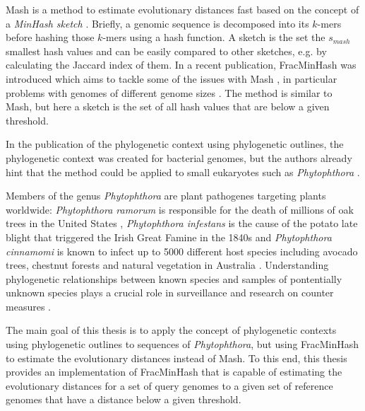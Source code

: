 Mash is a method to estimate evolutionary distances fast based on the concept of
a \textit{MinHash sketch}
\cite{broderResemblanceContainmentDocuments1998a,ondovMashFastGenome2016}.
Briefly, a genomic sequence is decomposed into its $k$-mers before hashing those
$k$-mers using a hash function. A sketch is the set the $s_{mash}$ smallest hash
values and can be easily compared to other sketches, e.g. by calculating the
Jaccard index of them. In a recent publication, FracMinHash was introduced which
aims to tackle some of the issues with Mash
\cite{irberLightweightCompositionalAnalysis2022}, in particular problems with
genomes of different genome sizes
\cite{heraDebiasingFracMinHashDeriving2023,irberLightweightCompositionalAnalysis2022}.
The method is similar to Mash, but here a sketch is the set of all hash values
that are below a given threshold.

In the publication of the phylogenetic context using phylogenetic outlines, the
phylogenetic context was created for bacterial genomes, but the authors already
hint that the method could be applied to small eukaryotes such as
\textit{Phytophthora} \cite{bagciMicrobialPhylogeneticContext2021}.

Members of the genus \textit{Phytophthora} are plant pathogenes targeting plants
worldwide: \textit{Phytophthora ramorum} is responsible for the death of
millions of oak trees in the United States
\cite{cobbMagnitudeRegionalScaleTree2020}, \textit{Phytophthora infestans} is
the cause of the potato late blight that triggered the Irish Great Famine in the
1840s \cite{yoshidaRiseFallPhytophthora2013} and \textit{Phytophthora cinnamomi}
is known to infect up to 5000 different host species including avocado trees,
chestnut forests and natural vegetation in Australia
\cite{hardhamPhytophthoraCinnamomi2018}. Understanding phylogenetic
relationships between known species and samples of pontentially unknown species
plays a crucial role in surveillance and research on counter measures
\cite{piomboMetagenomicsApproachesDetection2021}.


The main goal of this thesis is to apply the concept of phylogenetic contexts
using phylogenetic outlines to sequences of \textit{Phytophthora}, but using
FracMinHash to estimate the evolutionary distances instead of Mash. To this end,
this thesis provides an implementation of FracMinHash that is capable of
estimating the evolutionary distances for a set of query genomes to a given set
of reference genomes that have a distance below a given threshold.

